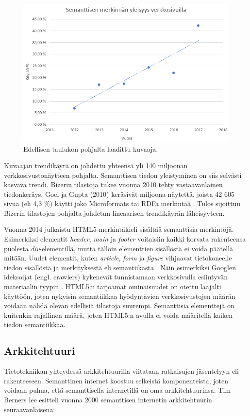 \documentclass[finnish, 12pt, a4paper, elec, utf8, pdfa, online]{aaltothesis}
\begin{document}
{\begin{figure}[htb]
\centering
\includegraphics[width=13cm]{images/verkkosivut.png}
\caption{Edellisen taulukon pohjalta laadittu kuvaaja. \label{images/verkkosivut}}
\end{figure}
\clearpage

Kuvaajan trendikäyrä on johdettu yhteensä yli 140 miljoonan verkkosivustonäytteen pohjalta. Semanttisen tiedon yleistyminen on siis selvästi kasvava trendi. Bizerin tilastoja tukee vuonna 2010 tehty vastaavanlainen tiedonkeräys. Goel ja Gupta (2010) keräsivät miljoona näytettä, joista 42 605 sivua (eli 4,3 \%) käytti joko Microformats tai RDFa merkintää \cite{Google}. Tulos sijoittuu Bizerin tilastojen pohjalta johdetun lineaarisen trendikäyrän läheisyyteen.

Vuonna 2014 julkaistu HTML5-merkintäkieli sisältää semanttisia merkintöjä. Esimerkiksi elementit \textit{header}, \textit{main} ja \textit{footer} voitaisiin kaikki korvata rakenteensa puolesta \textit{div}-elementillä, mutta tällöin elementtien sisällöstä ei voida päätellä mitään. Uudet elementit, kuten \textit{article}, \textit{form} ja \textit{figure} vihjaavat tietokoneelle tiedon sisällöstä ja merkityksestä eli semantiikasta \cite{html5}. Näin esimerkiksi Googlen ideksoijat (engl. crawlers) kykenevät tunnistamaan verkkosivulla esiintyvän materiaalin tyypin \cite{html5}. HTML5:n tarjoamat ominaisuudet on otettu laajalti käyttöön, joten nykyisin semantiikkaa hyödyntävien verkkosivustojen määrän voidaan nähdä olevan edellisiä tilastoja suurempi. Semanttisia elementtejä on kuitenkin rajallinen määrä, joten HTML5:n avulla ei voida määritellä kaiken tiedon semantiikkaa.

\subsection{Arkkitehtuuri}
Tietotekniikan yhteydessä arkkitehtuurilla viitataan ratkaisujen jäsentelyyn eli rakenteeseen. Semanttinen internet koostuu selkeistä komponenteista, joten voidaan puhua, että semanttisella internetillä on oma arkkitehtuurinsa. Tim-Berners lee esitteli vuonna 2000 semanttisen internetin arkkitehtuurin seuraavanlaisena:

}
\end{document}

